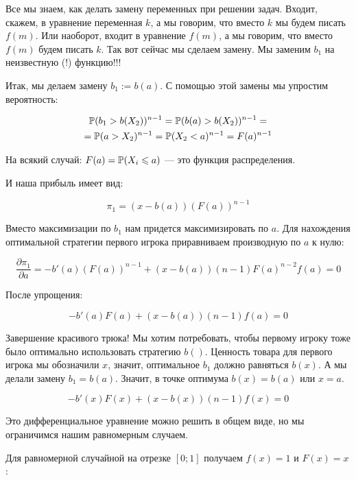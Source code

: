 \begin{enumerate}
Все мы знаем, как делать замену переменных при решении задач. Входит, скажем, в уравнение переменная $ k $, а мы говорим, что вместо $k$ мы будем писать $ f(m) $. Или наоборот, входит в уравнение $ f(m) $, а мы говорим, что вместо $ f(m) $ будем писать $k$. Так вот сейчас мы сделаем замену. Мы заменим $ b_{1} $ на неизвестную (!) функцию!!!

Итак, мы делаем замену $ b_{1}:=b(a) $. С помощью этой замены мы упростим вероятность:

\begin{multline}
\P(b_{1}>b(X_{2}))^{n-1}=\P(b(a)>b(X_{2}))^{n-1}=\\
=\P(a>X_{2})^{n-1}=\P(X_{2}<a)^{n-1}=F(a)^{n-1}
\end{multline}

На всякий случай: $ F(a)=\P(X_{i}\leq a) $ — это функция распределения.

И наша прибыль имеет вид:

\begin{equation}
\pi_{1}=(x-b(a))(F(a))^{n-1}
\end{equation}


Вместо максимизации по $ b_{1} $ нам придется максимизировать по $ a $. Для нахождения оптимальной стратегии первого игрока приравниваем производную по $ a $ к нулю:

\begin{equation}
\frac{\partial \pi_{1}}{\partial a}=-b'(a)(F(a))^{n-1}+(x-b(a))(n-1)F(a)^{n-2}f(a)=0
\end{equation}


После упрощения:

\begin{equation}
-b'(a)F(a)+(x-b(a))(n-1)f(a)=0
\end{equation}


Завершение красивого трюка! Мы хотим потребовать, чтобы первому игроку тоже было оптимально использовать стратегию $ b() $. Ценность товара для первого игрока мы обозначили $ x $, значит, оптимальное $ b_{1} $ должно равняться $ b(x) $. А мы делали замену $ b_{1}=b(a) $. Значит, в точке оптимума $ b(x)=b(a) $ или $ x=a $.

\begin{equation}
\label{first_price_final_diffeq}
-b'(x)F(x)+(x-b(x))(n-1)f(x)=0
\end{equation}


Это дифференциальное уравнение можно решить в общем виде, но мы ограничимся нашим равномерным случаем.

Для равномерной случайной на отрезке $ [0;1] $ получаем $ f(x)=1 $ и $ F(x)=x $:


\end{enumerate}
